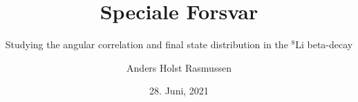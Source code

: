 \documentclass{beamer}
\title{Speciale Forsvar}
\subtitle{Studying the angular correlation and final state distribution in the $^8$Li beta-decay }
\author{Anders Holst Rasmussen}
\date{28. Juni, 2021}
\begin{document}
\frame\titlepage




\end{document}

